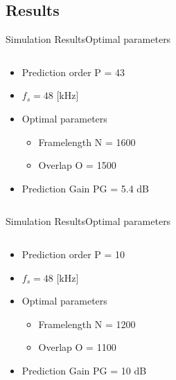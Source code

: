 \subsection{Results}
\begin{frame}{Simulation Results}{Optimal parameters}		
\begin{columns}
	\begin{column}{0.4\textwidth}
		\begin{itemize}
			\item Prediction order P = 43
			\item $f_s = 48$ [kHz]
			\item Optimal parameters
			\begin{itemize}
				\item Framelength N = 1600
				\item Overlap O = 1500
			\end{itemize}
			\item Prediction Gain PG = 5.4 dB
		\end{itemize}
	\end{column}
	\begin{column}{0.6\textwidth} 
		\resizebox{0.9\columnwidth}{!}{		
			}
	\end{column}
\end{columns}
\end{frame}

\begin{frame}{Simulation Results}{Optimal parameters}		
\begin{columns}
	\begin{column}{0.4\textwidth}
	\begin{itemize}
		\item Prediction order P = 10
		\item $f_s = 48$ [kHz]
		\item Optimal parameters
		\begin{itemize}
			\item Framelength N = 1200
			\item Overlap O = 1100
		\end{itemize}
		\item Prediction Gain PG = 10 dB
	\end{itemize}
	\end{column}
	\begin{column}{0.6\textwidth} 
		\resizebox{0.9\columnwidth}{!}{		
			}
	\end{column}
\end{columns}
\end{frame}


